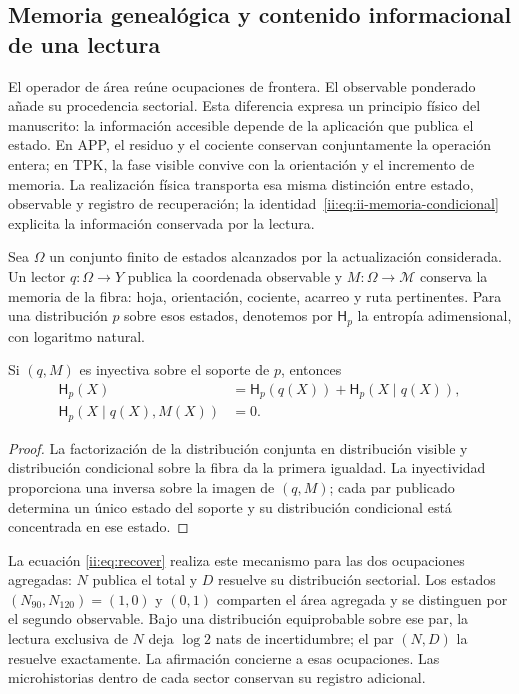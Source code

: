 \subsection{Memoria genealógica y contenido informacional de una lectura}
\label{ii:sec:ii-memoria-lectura}

El operador de área reúne ocupaciones de frontera. El observable
ponderado añade su procedencia sectorial. Esta diferencia expresa un
principio físico del manuscrito: la información accesible depende de
la aplicación que publica el estado. En APP, el residuo y el cociente
conservan conjuntamente la operación entera; en TPK, la fase visible
convive con la orientación y el incremento de memoria. La realización
física transporta esa misma distinción entre estado, observable y
registro de recuperación; la identidad~\eqref{ii:eq:ii-memoria-condicional} explicita la información conservada por la lectura.

Sea \(\Omega\) un conjunto finito de estados alcanzados por la
actualización considerada. Un lector \(q:\Omega\to Y\) publica la
coordenada observable y \(M:\Omega\to\mathcal M\) conserva la memoria
de la fibra: hoja, orientación, cociente, acarreo y ruta pertinentes.
Para una distribución \(p\) sobre esos estados, denotemos por
\(\mathsf H_p\) la entropía adimensional, con logaritmo natural.

\begin{proposition}
Si \((q,M)\) es inyectiva sobre el soporte de \(p\), entonces
\begin{align}
 \mathsf H_p(X)&=\mathsf H_p(q(X))+
                 \mathsf H_p(X\mid q(X)),\\
 \mathsf H_p(X\mid q(X),M(X))&=0.
 \label{ii:eq:ii-memoria-condicional}
\end{align}
\end{proposition}
\begin{proof}
La factorización de la distribución conjunta en distribución visible
y distribución condicional sobre la fibra da la primera igualdad.
La inyectividad proporciona una inversa sobre la imagen de \((q,M)\);
cada par publicado determina un único estado del soporte y su
distribución condicional está concentrada en ese estado.
\end{proof}

La ecuación \eqref{ii:eq:recover} realiza este mecanismo para las dos
ocupaciones agregadas: \(N\) publica el total y \(D\) resuelve su
distribución sectorial. Los estados \((N_{90},N_{120})=(1,0)\) y
\((0,1)\) comparten el área agregada y se distinguen por el segundo
observable. Bajo una distribución equiprobable sobre ese par, la
lectura exclusiva de \(N\) deja \(\log2\) nats de incertidumbre;
el par \((N,D)\) la resuelve exactamente. La afirmación concierne a
esas ocupaciones. Las microhistorias dentro de cada sector conservan
su registro adicional.

